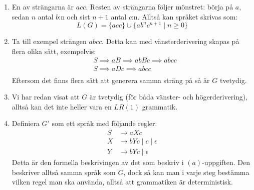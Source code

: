 \documentclass{article}
\begin{document}
\begin{enumerate}[label=(\alph*)]
    \item 
        En av strängarna är $acc$. Resten av strängarna följer mönstret: börja på $a$, sedan $n$ antal $b$:n och sist $n+1$ antal $c$:n. Alltså kan språket skrivas som:
        $$L(G) =\{acc\} \cup \{ab^nc^{n+1} \mid n \ge 0 \}$$
    \item
        Ta till exempel strängen $abcc$. Detta kan med vänsterderivering skapas på flera olika sätt, exempelvis:
        \begin{align*}
        &S \implies aB  \implies abBc \implies abcc \\
        &S \implies aDc \implies abcc \\
        \end{align*}
        Eftersom det finns flera sätt att generera samma sträng på så är $G$ tvetydig.
        
    \item 
        Vi har redan visat att $G$ är tvetydig (för båda vänster- och högerderivering), alltså kan det inte heller vara en $LR(1)$ grammatik.
    \item
        Definiera $G'$ som ett språk med följande regler:
        \begin{align*}
            S & \to aXc \\
            X & \to bYc \mid c \mid \epsilon \\
            Y & \to bYc \mid \epsilon
        \end{align*}
        Detta är den formella beskrivingen av det som beskriv i $(a)$-uppgiften. Den beskriver alltså samma språk som $G$, dock så kan man i varje steg bestämma vilken regel man ska använda, alltså att grammatiken är deterministisk.

\end{enumerate}

\section{}
\end{document}
